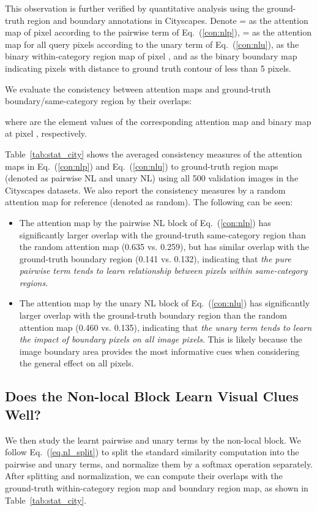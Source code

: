 \documentclass[runningheads]{llncs}
\begin{document}
This observation is further verified by quantitative analysis using the ground-truth region and boundary annotations in Cityscapes. Denote =  as the attention map of pixel  according to the pairwise term of Eq.~(\ref{con:nlp}), = as the attention map for all query pixels according to the unary term of Eq.~(\ref{con:nlu}),  as the binary within-category region map of pixel , and  as the binary boundary map indicating pixels with distance to ground truth contour of less than 5 pixels.

We evaluate the consistency between attention maps  and ground-truth boundary/same-category region  by their overlaps:

where  are the element values of the corresponding attention map and binary map at pixel , respectively.

Table~\ref{tab:stat_city} shows the averaged consistency measures of the attention maps in Eq.~(\ref{con:nlp}) and Eq.~(\ref{con:nlu}) to ground-truth region maps (denoted as pairwise NL and unary NL) using all 500 validation images in the Cityscapes datasets. We also report the consistency measures by a random attention map for reference (denoted as random). The following can be seen:
\begin{itemize}
    \item The attention map by the pairwise NL block of Eq.~(\ref{con:nlp}) has significantly larger overlap with the ground-truth same-category region than the random attention map (0.635 vs. 0.259), but has similar overlap with the ground-truth boundary region (0.141 vs. 0.132), indicating that \emph{the pure pairwise term tends to learn relationship between pixels within same-category regions}.
    \item The attention map by the unary NL block of Eq.~(\ref{con:nlu}) has significantly larger overlap with the ground-truth boundary region than the random attention map (0.460 vs. 0.135), indicating that \emph{the unary term tends to learn the impact of boundary pixels on all image pixels}. This is likely because the image boundary area provides the most informative cues when considering the general effect on all pixels.
\end{itemize}

\subsection{Does the Non-local Block Learn Visual Clues Well?}

We then study the learnt pairwise and unary terms by the non-local block. We follow Eq.~(\ref{eq.nl_split}) to split the standard similarity computation into the pairwise and unary terms, and normalize them by a softmax operation separately. After splitting and normalization, we can compute their overlaps with the ground-truth within-category region map and boundary region map, as shown in Table~\ref{tab:stat_city}.
\end{document}
